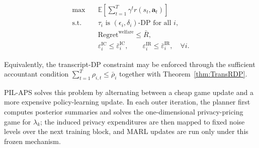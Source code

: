 \documentclass{article}
\begin{document}
$$\begin{aligned}
\max \quad & \mathbb{E}\left[\sum_{t=1}^{T}\gamma^t r(s_t,\mathbf{a}_t)\right] \\
\text{s.t.}\quad & \tau_i \text{ is } (\epsilon_i,\delta_i)\text{-DP for all } i, \\
& \mathrm{Regret}^{\mathrm{welfare}} \le \bar R, \\
& \varepsilon_i^{\mathrm{IC}} \le \bar{\varepsilon}_i^{\mathrm{IC}}, \qquad \varepsilon_i^{\mathrm{IR}} \le \bar{\varepsilon}_i^{\mathrm{IR}}, \quad \forall i.
\end{aligned}$$

Equivalently, the transcript-DP constraint may be enforced through the sufficient accountant condition $\sum_{t=1}^{T}\rho_{i,t}\le \bar\rho_i$ together with Theorem~\ref{thm:TransRDP}.

PIL-APS solves this problem by alternating between a cheap game update and a more expensive policy-learning update. In each outer iteration, the planner first computes posterior summaries and solves the one-dimensional privacy-pricing game for $\lambda_k$; the induced privacy expenditures are then mapped to fixed noise levels over the next training block, and MARL updates are run only under this frozen mechanism.
\end{document}
